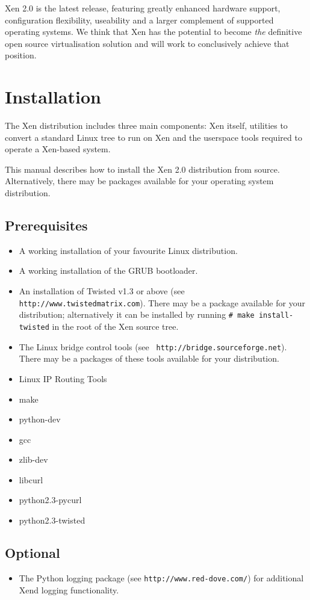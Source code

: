 \documentclass[11pt,twoside,final,openright]{xenstyle}
\begin{document}
Xen 2.0 is the latest release, featuring greatly enhanced hardware
support, configuration flexibility, useability and a larger complement
of supported operating systems.  We think that Xen has the potential
to become {\em the} definitive open source virtualisation solution and
will work to conclusively achieve that position.


\chapter{Installation}

The Xen distribution includes three main components: Xen itself,
utilities to convert a standard Linux tree to run on Xen and the
userspace tools required to operate a Xen-based system.

This manual describes how to install the Xen 2.0 distribution from
source.  Alternatively, there may be packages available for your
operating system distribution.

\section{Prerequisites}
\label{sec:prerequisites}
\begin{itemize}
\item A working installation of your favourite Linux distribution.
\item A working installation of the GRUB bootloader.
\item An installation of Twisted v1.3 or above (see {\tt
http://www.twistedmatrix.com}).  There may be a package available for
your distribution; alternatively it can be installed by running {\tt \#
make install-twisted} in the root of the Xen source tree.
\item The Linux bridge control tools (see {\tt
http://bridge.sourceforge.net}).  There may be a packages of these
tools available for your distribution.
\item Linux IP Routing Tools
\item make
\item python-dev
\item gcc
\item zlib-dev
\item libcurl
\item python2.3-pycurl
\item python2.3-twisted
\end{itemize}

\section{Optional}
\begin{itemize}
\item The Python logging package (see {\tt http://www.red-dove.com/})
for additional Xend logging functionality.
\end{itemize}
\end{document}
